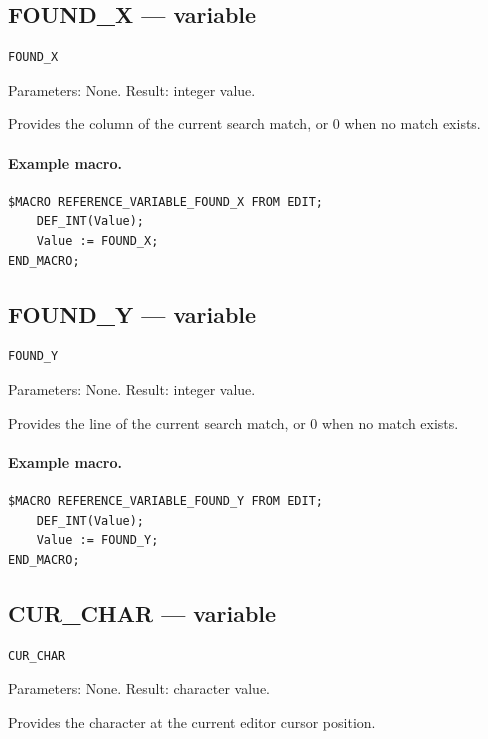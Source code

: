 \documentclass[a4paper,10pt,twoside,openany]{book}
\begin{document}
\label{prim:variable-found-x}
\subsection*{FOUND\_X --- variable}
\begin{verbatim}
FOUND_X
\end{verbatim}
Parameters: None. Result: integer value.

Provides the column of the current search match, or 0 when no match exists.

\paragraph{Example macro.}
\begin{verbatim}
$MACRO REFERENCE_VARIABLE_FOUND_X FROM EDIT;
    DEF_INT(Value);
    Value := FOUND_X;
END_MACRO;
\end{verbatim}

\label{prim:variable-found-y}
\subsection*{FOUND\_Y --- variable}
\begin{verbatim}
FOUND_Y
\end{verbatim}
Parameters: None. Result: integer value.

Provides the line of the current search match, or 0 when no match exists.

\paragraph{Example macro.}
\begin{verbatim}
$MACRO REFERENCE_VARIABLE_FOUND_Y FROM EDIT;
    DEF_INT(Value);
    Value := FOUND_Y;
END_MACRO;
\end{verbatim}

\label{prim:variable-cur-char}
\subsection*{CUR\_CHAR --- variable}
\begin{verbatim}
CUR_CHAR
\end{verbatim}
Parameters: None. Result: character value.

Provides the character at the current editor cursor position.
\end{document}
